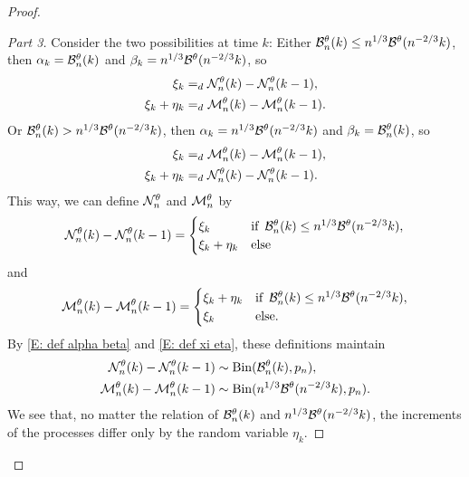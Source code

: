 \begin{proof}
\begin{proof}[Part 3]
Consider the two possibilities at time $k$:
Either $\mathcal{B}_n^{\theta}(k) \leq n^{1 / 3}\mathcal{B}^{\theta}(n^{-2 / 3}k)$,
then $\alpha_k = \mathcal{B}_n^{\theta}(k)$ and $\beta_k = n^{1 / 3}\mathcal{B}^{\theta}(n^{-2 / 3}k)$, 
so 
\begin{equation*}
\begin{aligned}
\xi_k &=_d \mathcal{N}_n^{\theta}(k) - \mathcal{N}_n^{\theta}(k-1), \\
\xi_k + \eta_k &=_d \mathcal{M}_n^{\theta}(k) - \mathcal{M}_n^{\theta}(k-1).
\end{aligned}
\end{equation*}
Or $\mathcal{B}_n^{\theta}(k) > n^{1 / 3}\mathcal{B}^{\theta}(n^{-2 / 3}k)$,
then $\alpha_k = n^{1 / 3}\mathcal{B}^{\theta}(n^{-2 / 3}k)$ and $\beta_k = \mathcal{B}_n^{\theta}(k)$, 
so
\begin{equation*}
\begin{aligned}
\xi_k &=_d \mathcal{M}_n^{\theta}(k) - \mathcal{M}_n^{\theta}(k-1), \\
\xi_k + \eta_k &=_d \mathcal{N}_n^{\theta}(k) - \mathcal{N}_n^{\theta}(k-1).
\end{aligned}
\end{equation*}
This way, we can define $\mathcal{N}_n^{\theta}$ and $\mathcal{M}_n^{\theta}$ by
\begin{equation*}
\mathcal{N}_n^{\theta}(k) - \mathcal{N}_n^{\theta}(k-1) = 
\begin{cases}
\xi_k & \text{if} \enspace \mathcal{B}_n^{\theta}(k) \leq n^{1 / 3}\mathcal{B}^{\theta}(n^{-2 / 3}k), \\
\xi_k + \eta_k &\text{else}
\end{cases}
\end{equation*}
and
\begin{equation*}
\mathcal{M}_n^{\theta}(k) - \mathcal{M}_n^{\theta}(k-1) = 
\begin{cases}
\xi_k + \eta_k & \text{if} \enspace \mathcal{B}_n^{\theta}(k) \leq n^{1 / 3}\mathcal{B}^{\theta}(n^{-2 / 3}k), \\
\xi_k &\text{else}.
\end{cases}
\end{equation*}
By \eqref{E: def alpha beta} and \eqref{E: def xi eta},
these definitions maintain
\begin{equation*}
\begin{aligned}
\mathcal{N}_n^{\theta}(k) - \mathcal{N}_n^{\theta}(k-1) &\sim \operatorname*{Bin}(\mathcal{B}_n^{\theta}(k), p_n), \\
\mathcal{M}_n^{\theta}(k) - \mathcal{M}_n^{\theta}(k-1) &\sim \operatorname*{Bin}(n^{1 / 3} \mathcal{B}^{\theta}(n^{-2 / 3}k), p_n).
\end{aligned}
\end{equation*}
We see that, no matter the relation of $\mathcal{B}_n^{\theta}(k)$ and $n^{1 / 3}\mathcal{B}^{\theta}(n^{-2 / 3}k)$, 
the increments of the processes differ only by the random variable $\eta_k$.


\end{proof}
\end{proof}
